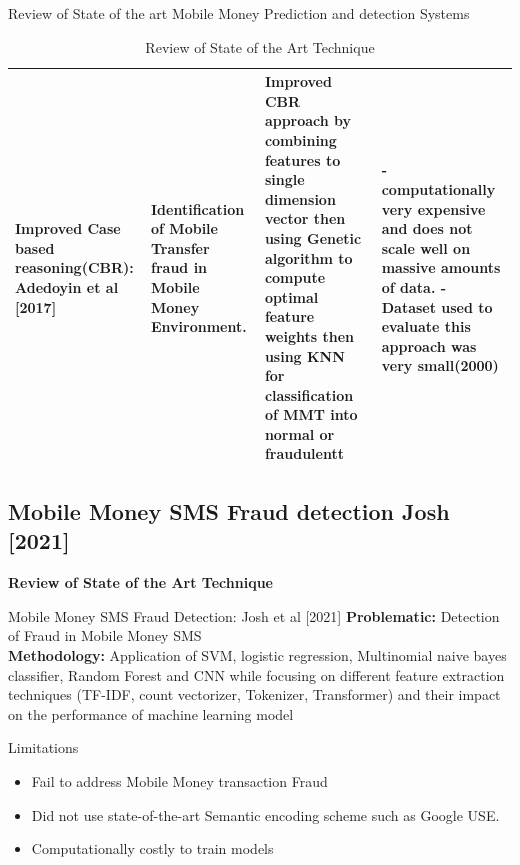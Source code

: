 \documentclass[11pt,aspectratio=169]{beamer}
\begin{document}
\begin{frame}{Review of State of the art Mobile Money Prediction and detection Systems}
\begin{table}
\begin{center}
{\begin{tabular}{ | m{2.5 cm} | m{2.5 cm} | m{4 cm} | m{4 cm} |}
						\textbf{Improved Case based reasoning(CBR): Adedoyin et al [2017]}
						&Identification of Mobile Transfer fraud in Mobile Money Environment. &Improved CBR approach by combining features to single dimension
						vector then using Genetic algorithm to compute optimal feature weights then using
						KNN for classification of MMT into normal or fraudulentt & - computationally very expensive and does not scale well on massive amounts of
						data. \newline
						- Dataset used to evaluate this approach was very small(2000)  \\
						\hline		
					\end{tabular}
				}
			\end{center}
			\caption{Review of State of the Art Technique}
			\label{table 1}
		\end{table}
	\end{frame}




		\subsection{Mobile Money SMS Fraud detection Josh [2021]}
		\begin{frame}{\small{\textbf{ Review of State of the Art Technique}}}
			\begin{block}{Mobile Money SMS Fraud Detection: Josh et al [2021]}
				\textbf{Problematic:} 
					Detection of Fraud in Mobile Money SMS\\
				
				\textbf{Methodology:} 
				Application of SVM, logistic regression, Multinomial naive bayes classifier, Random Forest and CNN while focusing on different feature extraction techniques (TF-IDF, count vectorizer, Tokenizer, Transformer) and their impact on the performance of machine learning model
			
			\end{block}
		
			
					\begin{block}{ Limitations}
						\begin{itemize}
							\item Fail to address Mobile Money transaction Fraud
							\item Did not use state-of-the-art Semantic encoding scheme such as Google USE.
							\item Computationally costly to train models
						\end{itemize}
					\end{block}
			
			
		\end{frame}
	
\end{document}
